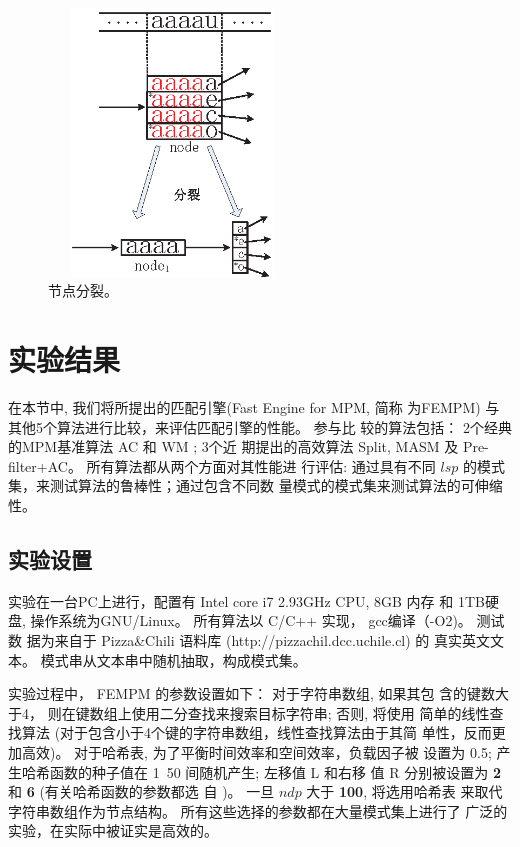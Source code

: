 \begin{figure}[H]
  \centering
  \includegraphics[height=2.8in, width=2.6in]{figures/2_MPM/node_split}
  \caption{节点分裂。}
  \label{fig:split}
\end{figure}

\section{实验结果}
\label{sec:2_experiments}

在本节中, 我们将所提出的匹配引擎(Fast Engine for MPM, 简称
为\textsf{FEMPM}) 与其他5个算法进行比较，来评估匹配引擎的性能。 参与比
较的算法包括： 2个经典的MPM基准算法 \textsf{AC} 和 \textsf{WM} ; 3个近
期提出的高效算法 \textsf{Split},
\textsf{MASM} 及 \textsf{Pre-filter+AC}。 所有算法都从两个方面对其性能进
行评估: 通过具有不同 $lsp$ 的模式集，来测试算法的鲁棒性；通过包含不同数
量模式的模式集来测试算法的可伸缩性。

\subsection{实验设置}


实验在一台PC上进行，配置有 Intel core i7 2.93GHz CPU, 8GB 内存 和 1TB硬
盘, 操作系统为GNU/Linux。 所有算法以 C/C++ 实现， gcc编译（-O2)。 测试数
据为来自于 Pizza\;\&\;Chili 语料库 (http://pizzachil.dcc.uchile.cl) 的
真实英文文本。 模式串从文本串中随机抽取，构成模式集。

实验过程中， \textsf{FEMPM} 的参数设置如下： 对于字符串数组, 如果其包
含的键数大于4， 则在键数组上使用二分查找来搜索目标字符串; 否则, 将使用
简单的线性查找算法 (对于包含小于4个键的字符串数组，线性查找算法由于其简
单性，反而更加高效)。 对于哈希表, 为了平衡时间效率和空间效率，负载因子被
设置为 {0.5}; 产生哈希函数的种子值在 1~50 间随机产生; 左移值 L 和右移
值 R 分别被设置为 \textbf{2} 和 \textbf{6} (有关哈希函数的参数都选
自 \cite{Ramakrishna1997})。 一旦 $ndp$ 大于 \textbf{100}, 将选用哈希表
来取代字符串数组作为节点结构。 所有这些选择的参数都在大量模式集上进行了
广泛的实验，在实际中被证实是高效的。

